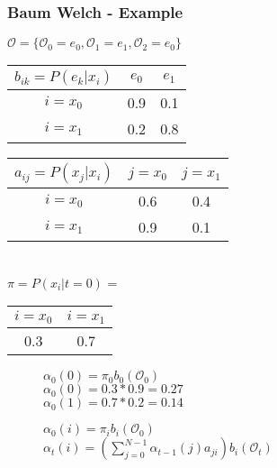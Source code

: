 \begin{frame}
	\frametitle{Baum Welch - Example}
  \begin{table}
  \centering
  $\mathcal{O} = \{\mathcal{O}_0 = e_0, \mathcal{O}_1 = e_1, \mathcal{O}_2 = e_0\}$\\
  \begin{tabular}{| c | c | c |}
  	\hline
    $b_{ik} = P(e_k|x_i)$ & $e_0$ & $e_1$ \\ \hline
    $i = x_0$                 & 0.9   & 0.1   \\ \hline
    $i = x_1$                 & 0.2   & 0.8   \\ \hline
  \end{tabular}
  \begin{tabular}{| c | c | c |}
  	\hline
    $a_{ij} = P(x_j|x_i)$ & $j = x_0$ & $j = x_1$ \\ \hline
    $i = x_0$                 & 0.6   & 0.4   \\ \hline
    $i = x_1$                 & 0.9   & 0.1   \\ \hline
  \end{tabular}
  \\$\pi = P(x_i|t=0)$ =
  \begin{tabular}{| c | c |}
  	\hline
    $i = x_0$ & $i = x_1$ \\ \hline
    0.3   & 0.7   \\ \hline
  \end{tabular}
  \begin{subfigure}{4.3cm}
  \begin{framed}
  $\alpha_0(0)=\pi_0 b_0(\mathcal{O}_0)$\\
  $\alpha_0(0)=0.3*0.9=0.27$\\
  $\alpha_0(1)=0.7*0.2=0.14$
  \end{framed}
  \end{subfigure}
  \begin{subfigure}{5.4cm}
  \centering
  \begin{framed}
  $\alpha_0(i) = \pi_i b_i(\mathcal{O}_0)$\\
  $\alpha_t(i) = \left(\sum\limits_{j=0}^{N-1} \alpha_{t-1}(j)a_{ji}\right)b_i(\mathcal{O}_t)$
  \end{framed}  
  \end{subfigure}
\end{table}
\end{frame}

